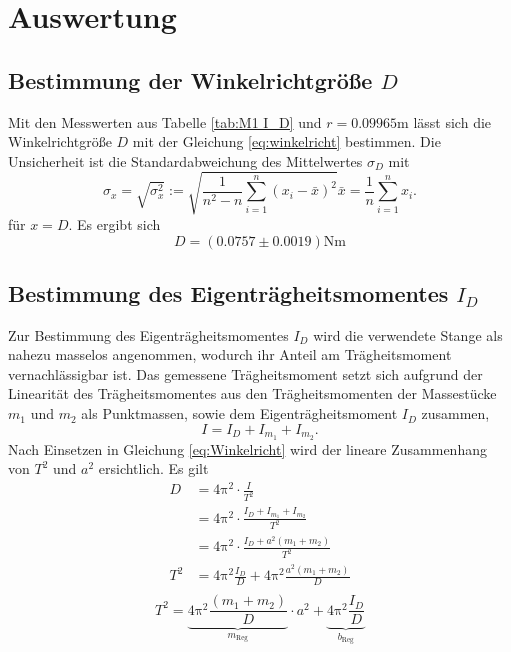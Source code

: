 \section{Auswertung} %
\label{sec:swrtng}
\subsection{Bestimmung der Winkelrichtgröße $D$}

Mit den Messwerten aus Tabelle \ref{tab:M1 I_D} und $r=0.09965\si{\meter}$ lässt sich die Winkelrichtgröße $D$ mit der Gleichung \eqref{eq:winkelricht} bestimmen. Die Unsicherheit ist die Standardabweichung des Mittelwertes $\sigma_D$ mit
\begin{subequations}
	\begin{equation}
		\sigma_x = \sqrt{\sigma_x^2} := \sqrt{\frac{1}{n^2-n} \sum_{i=1}^n{(x_i-\bar{x})^2}}
	\end{equation}
	\begin{equation}
		\bar{x} = \frac{1}{n} \sum_{i=1}^n{x_i}.
	\end{equation}
\end{subequations}
für $x=D$.
Es ergibt sich 
\begin{equation}
	\label{wert:Winkelricht}
	D=(0.0757\pm0.0019)\si{\newton\meter}
\end{equation}
\subsection{Bestimmung des Eigenträgheitsmomentes $I_D$}

Zur Bestimmung des Eigenträgheitsmomentes $I_D$ wird die verwendete Stange als nahezu masselos angenommen, 
wodurch ihr Anteil am Trägheitsmoment vernachlässigbar ist. 
Das gemessene Trägheitsmoment setzt sich aufgrund der Linearität des Trägheitsmomentes aus den Trägheitsmomenten der Massestücke $m_1$ und $m_2$ als Punktmassen, sowie dem Eigenträgheitsmoment $I_D$ zusammen,
\begin{equation}
	I= I_D+I_{m_1}+I_{m_2}.
\end{equation}
Nach Einsetzen in Gleichung \eqref{eq:Winkelricht} wird der lineare Zusammenhang von $T^2$ und $a^2$ ersichtlich.
Es gilt
\begin{align*}
	 D &= 4\mathup{\pi^{2}}\cdot\frac{I}{T^2}\\
	   &= 4\mathup{\pi^{2}}\cdot\frac{I_D+I_{m_1}+I_{m_2}}{T^2}\\
	   &= 4\mathup{\pi^{2}}\cdot\frac{I_D+a^{2}(m_1+m_2)}{T^2}\\
	T^2&= 4\mathup{\pi^{2}}\frac{I_D}{D}+4\mathup{\pi^{2}}\frac{a^{2}(m_1+m_2)}{D}\\
\end{align*}
\begin{equation}
	\label{eq:Reg_ident}
	T^2= \underbrace{4\mathup{\pi^{2}}\frac{(m_1+m_2)}{D}}_{m_{\text{Reg}}}\cdot a^{2}+\underbrace{4\mathup{\pi^{2}}\frac{I_D}{D}}_{b_{\text{Reg}}}
\end{equation}

